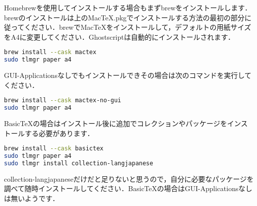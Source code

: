 Homebrewを使用してインストールする場合もまずbrewをインストールします．brewのインストールは上のMacTeX.pkgでインストールする方法の最初の部分に従ってください．brewでMac\TeX をインストールして，デフォルトの用紙サイズをA4に変更してください．Ghostscriptは自動的にインストールされます．
\begin{lstlisting}[language=bash]
brew install --cask mactex
sudo tlmgr paper a4
\end{lstlisting}
GUI-Applicationsなしでもインストールできその場合は次のコマンドを実行してください．
\begin{lstlisting}[language=bash]
brew install --cask mactex-no-gui
sudo tlmgr paper a4
\end{lstlisting}
Basic\TeX の場合はインストール後に追加でコレクションやパッケージをインストールする必要があります．
\begin{lstlisting}[language=bash]
brew install --cask basictex
sudo tlmgr paper a4
sudo tlmgr install collection-langjapanese
\end{lstlisting}
collection-langjapaneseだけだと足りないと思うので，自分に必要なパッケージを調べて随時インストールしてください．Basic\TeX の場合はGUI-Applicationsなしは無いようです．

